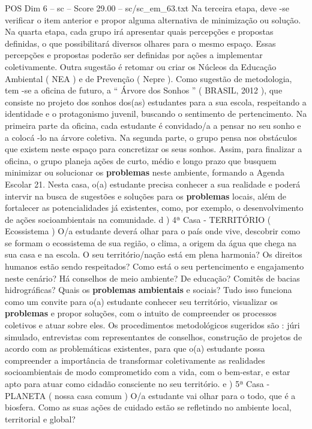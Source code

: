 \begin{textsample}{POS Dim 6 – sc – Score 29.00 – sc/sc\_em\_63.txt}
Na terceira etapa, deve -se verificar o item anterior e propor alguma alternativa de minimização ou solução.
Na quarta etapa, cada grupo irá apresentar quais percepções e propostas definidas, o que possibilitará diversos olhares para o mesmo espaço.
Essas percepções e propostas poderão ser definidas por ações a implementar coletivamente.
Outra sugestão é retomar ou criar os Núcleos da Educação Ambiental ( NEA ) e de Prevenção ( Nepre ).
Como sugestão de metodologia, tem -se a oficina de futuro, a “ Árvore dos Sonhos ” ( BRASIL, 2012 ), que consiste no projeto dos sonhos dos(as) estudantes para a sua escola, respeitando a identidade e o protagonismo juvenil, buscando o sentimento de pertencimento.
Na primeira parte da oficina, cada estudante é convidado/a a pensar no seu sonho e a colocá -lo na árvore coletiva.
Na segunda parte, o grupo pensa nos obstáculos que existem neste espaço para concretizar os seus sonhos.
Assim, para finalizar a oficina, o grupo planeja ações de curto, médio e longo prazo que busquem minimizar ou solucionar os \textbf{problemas} neste ambiente, formando a Agenda Escolar 21.
Nesta casa, o(a) estudante precisa conhecer a sua realidade e poderá intervir na busca de sugestões e soluções para os \textbf{problemas} locais, além de fortalecer as potencialidades já existentes, como, por exemplo, o desenvolvimento de ações socioambientais na comunidade. d ) 4ª Casa - TERRITÓRIO ( Ecossistema ) O/a estudante deverá olhar para o país onde vive, descobrir como se formam o ecossistema de sua região, o clima, a origem da água que chega na sua casa e na escola.
O seu território/nação está em plena harmonia?
Os direitos humanos estão sendo respeitados?
Como está o seu pertencimento e engajamento neste cenário?
Há conselhos de meio ambiente?
De educação?
Comitês de bacias hidrográficas?
Quais os \textbf{problemas} \textbf{ambientais} e sociais?
Tudo isso funciona como um convite para o(a) estudante conhecer seu território, visualizar os \textbf{problemas} e propor soluções, com o intuito de compreender os processos coletivos e atuar sobre eles.
Os procedimentos metodológicos sugeridos são : júri simulado, entrevistas com representantes de conselhos, construção de projetos de acordo com as problemáticas existentes, para que o(a) estudante possa compreender a importância de transformar coletivamente as realidades socioambientais de modo comprometido com a vida, com o bem-estar, e estar apto para atuar como cidadão consciente no seu território. e ) 5ª Casa - PLANETA ( nossa casa comum ) O/a estudante vai olhar para o todo, que é a biosfera.
Como as suas ações de cuidado estão se refletindo no ambiente local, territorial e global?

\end{textsample}
